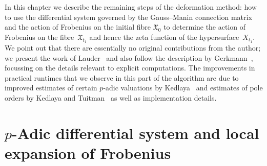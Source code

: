 
In this chapter we describe the remaining steps of the deformation method:  
how to use the differential system governed by the Gauss--Manin connection 
matrix and the action of Frobenius on the initial fibre $\mathfrak{X}_0$ 
to determine the action of Frobenius on the fibre~$\mathfrak{X}_{t_1}$ 
and hence the zeta function of the hypersurface~$X_{t_1}$.
We point out that there are essentially no original contributions from the 
author;  we present the work of Lauder~\citep{Lau04} and also follow the 
description by Gerkmann~\citep{Gerkmann2007}, focussing on the details 
relevant to explicit computations.  The improvements in practical runtimes 
that we observe in this part of the algorithm are due to improved estimates 
of certain $p$-adic valuations by Kedlaya~\citep{Kedlaya2010} and estimates 
of pole orders by Kedlaya and Tuitman~\citep{KedlayaTuitman2012} as well as 
implementation details.

\section{$p$-Adic differential system and local expansion of Frobenius}

